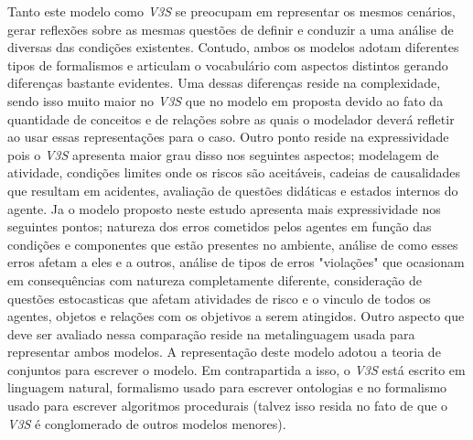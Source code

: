 Tanto este modelo como \textit{V3S} se preocupam em representar os mesmos cenários, gerar reflexões sobre as mesmas questões de definir e conduzir a uma análise de diversas das condições existentes. Contudo, ambos os modelos adotam diferentes tipos de formalismos e articulam o vocabulário com aspectos distintos gerando diferenças bastante evidentes. Uma dessas diferenças reside 
na complexidade, sendo isso muito maior no \textit{V3S} que no modelo em proposta devido ao fato da quantidade de conceitos e de relações sobre as quais o modelador deverá refletir ao usar essas representações para o caso. Outro ponto reside na expressividade pois o \textit{V3S} apresenta maior grau disso nos seguintes aspectos; modelagem de atividade, condições limites onde os 
riscos são aceitáveis, cadeias de causalidades que resultam em acidentes, avaliação de questões didáticas e estados internos do agente. Ja o modelo proposto neste estudo apresenta mais expressividade nos seguintes pontos; natureza dos erros cometidos pelos agentes em função das condições e componentes que estão presentes no ambiente, análise de como esses erros afetam a eles e a outros, análise de tipos de erros "violações" que ocasionam em consequências com natureza completamente diferente, consideração de questões estocasticas que afetam atividades de risco e o vinculo de todos os agentes, objetos e relações com os objetivos a serem atingidos. Outro aspecto que deve ser avaliado nessa comparação reside na metalinguagem usada para representar ambos modelos. A representação deste modelo adotou a teoria de conjuntos para escrever o modelo. Em contrapartida a isso, o \textit{V3S} está escrito em linguagem natural, formalismo usado para escrever ontologias e no formalismo usado para escrever algoritmos procedurais (talvez isso resida no fato de que o \textit{V3S} é conglomerado de outros modelos menores).